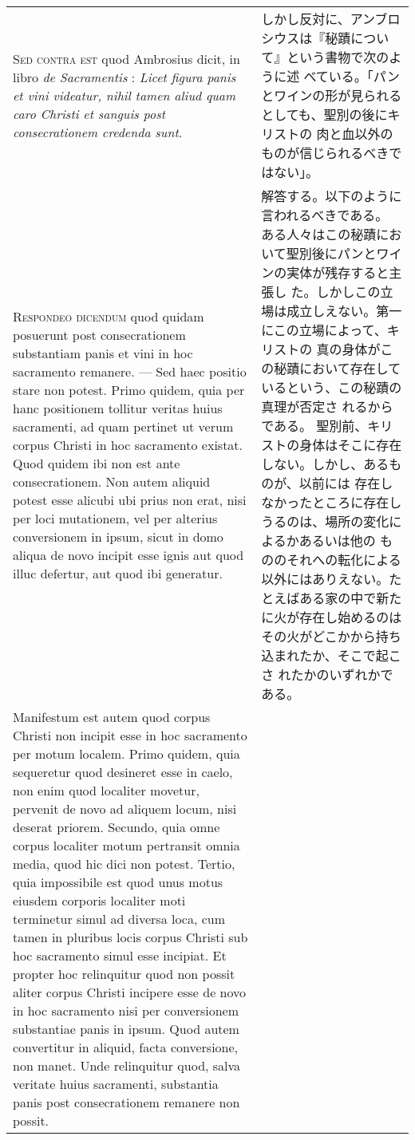 \documentclass[10pt]{jsarticle} %
\begin{document}
\begin{longtable}{p{21em}p{21em}}
\\



{\scshape Sed contra est} quod Ambrosius dicit, in libro {\itshape de
 Sacramentis} : {\itshape Licet
figura panis et vini videatur, nihil tamen aliud quam caro Christi et
sanguis post consecrationem credenda sunt}.

&

しかし反対に、アンブロシウスは『秘蹟について』という書物で次のように述
 べている。「パンとワインの形が見られるとしても、聖別の後にキリストの
 肉と血以外のものが信じられるべきではない」。

\\



{\scshape Respondeo dicendum} quod quidam posuerunt post consecrationem
substantiam panis et vini in hoc sacramento remanere. --- Sed haec positio
stare non potest. Primo quidem, quia per hanc positionem tollitur
veritas huius sacramenti, ad quam pertinet ut verum corpus Christi in
hoc sacramento existat. Quod quidem ibi non est ante
consecrationem. Non autem aliquid potest esse alicubi ubi prius non
erat, nisi per loci mutationem, vel per alterius conversionem in
ipsum, sicut in domo aliqua de novo incipit esse ignis aut quod illuc
defertur, aut quod ibi generatur. 

&

解答する。以下のように言われるべきである。
ある人々はこの秘蹟において聖別後にパンとワインの実体が残存すると主張し
 た。しかしこの立場は成立しえない。第一にこの立場によって、キリストの
 真の身体がこの秘蹟において存在しているという、この秘蹟の真理が否定さ
 れるからである。
聖別前、キリストの身体はそこに存在しない。しかし、あるものが、以前には
 存在しなかったところに存在しうるのは、場所の変化によるかあるいは他の
 もののそれへの転化による以外にはありえない。たとえばある家の中で新た
 に火が存在し始めるのはその火がどこかから持ち込まれたか、そこで起こさ
 れたかのいずれかである。


\\

Manifestum est autem quod corpus
Christi non incipit esse in hoc sacramento per motum localem. Primo
quidem, quia sequeretur quod desineret esse in caelo, non enim quod
localiter movetur, pervenit de novo ad aliquem locum, nisi deserat
priorem. Secundo, quia omne corpus localiter motum pertransit omnia
media, quod hic dici non potest. Tertio, quia impossibile est quod
unus motus eiusdem corporis localiter moti terminetur simul ad diversa
loca, cum tamen in pluribus locis corpus Christi sub hoc sacramento
simul esse incipiat. Et propter hoc relinquitur quod non possit aliter
corpus Christi incipere esse de novo in hoc sacramento nisi per
conversionem substantiae panis in ipsum. Quod autem convertitur in
aliquid, facta conversione, non manet. Unde relinquitur quod, salva
veritate huius sacramenti, substantia panis post consecrationem
remanere non possit.



\end{longtable}
\end{document}
